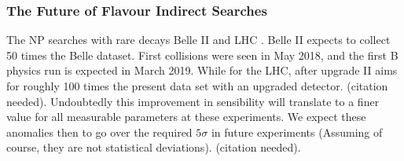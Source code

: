 \subsubsection{The Future of Flavour Indirect Searches}

The NP searches with rare decays  Belle II and  LHC . Belle II expects to collect 50 times the Belle dataset. First collisions were seen in May 2018, and the first B physics run is expected in March 2019. While for the LHC, after upgrade II aims for roughly 100 times the present data set with an upgraded detector. {\color{blue} (citation needed)}.
%
%
Undoubtedly this improvement in sensibility will translate to a finer value for all measurable parameters at these experiments. We expect these anomalies then to go over the required $5 \sigma$ in future experiments (Assuming of course, they are not statistical deviations). {\color{blue} (citation needed)}.

